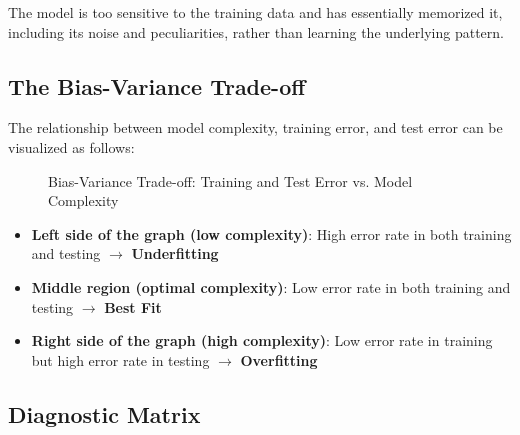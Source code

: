 \documentclass[11pt,a4paper]{article}
\theoremstyle{definition}
\theoremstyle{plain}
\theoremstyle{remark}
\begin{document}
The model is too sensitive to the training data and has essentially memorized it, including its noise and peculiarities, rather than learning the underlying pattern.

\subsection{The Bias-Variance Trade-off}

The relationship between model complexity, training error, and test error can be visualized as follows:

\begin{figure}[h]
\centering
{}
\caption{Bias-Variance Trade-off: Training and Test Error vs. Model Complexity}
\end{figure}

\begin{itemize}
    \item \textbf{Left side of the graph (low complexity)}: High error rate in both training and testing $\rightarrow$ \textbf{Underfitting}
    \item \textbf{Middle region (optimal complexity)}: Low error rate in both training and testing $\rightarrow$ \textbf{Best Fit}
    \item \textbf{Right side of the graph (high complexity)}: Low error rate in training but high error rate in testing $\rightarrow$ \textbf{Overfitting}
\end{itemize}

\subsection{Diagnostic Matrix}
\end{document}
